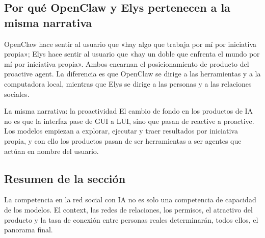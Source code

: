 \subsection{Por qué OpenClaw y Elys pertenecen a la misma narrativa}

OpenClaw hace sentir al usuario que «hay algo que trabaja por mí por iniciativa propia»; Elys hace sentir al usuario que «hay un doble que enfrenta el mundo por mí por iniciativa propia». Ambos encarnan el posicionamiento de producto del proactive agent. La diferencia es que OpenClaw se dirige a las herramientas y a la computadora local, mientras que Elys se dirige a las personas y a las relaciones sociales.

\begin{importantbox}{La misma narrativa: la proactividad}
El cambio de fondo en los productos de IA no es que la interfaz pase de GUI a LUI, sino que pasan de reactive a proactive. Los modelos empiezan a explorar, ejecutar y traer resultados por iniciativa propia, y con ello los productos pasan de ser herramientas a ser agentes que actúan en nombre del usuario.
\end{importantbox}

\subsection{Resumen de la sección}

La competencia en la red social con IA no es solo una competencia de capacidad de los modelos. El context, las redes de relaciones, los permisos, el atractivo del producto y la tasa de conexión entre personas reales determinarán, todos ellos, el panorama final.
